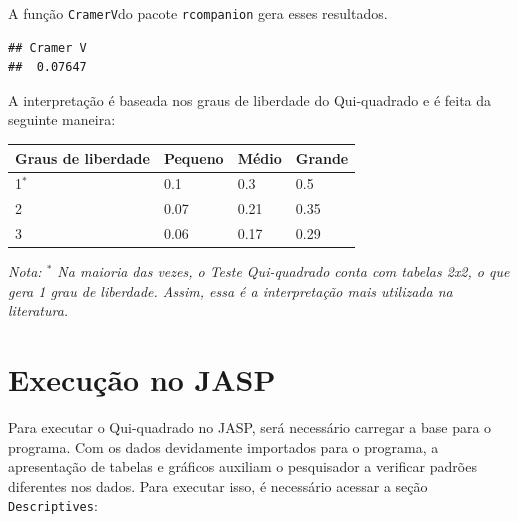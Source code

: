 \documentclass[
]{book}
\newenvironment{Shaded}{\begin{snugshade}}{\end{snugshade}}
\newcommand{\KeywordTok}[1]{\textcolor[rgb]{0.13,0.29,0.53}{\textbf{#1}}}
\newcommand{\NormalTok}[1]{#1}
\newcommand{\OperatorTok}[1]{\textcolor[rgb]{0.81,0.36,0.00}{\textbf{#1}}}
\begin{document}
A função \texttt{CramerV}do pacote \texttt{rcompanion} gera esses resultados.

\begin{Shaded}
\end{Shaded}

\begin{verbatim}
## Cramer V 
##  0.07647
\end{verbatim}

A interpretação é baseada nos graus de liberdade do Qui-quadrado e é feita da seguinte maneira:

\begin{longtable}[]{@{}llll@{}}
\toprule
Graus de liberdade & Pequeno & Médio & Grande\tabularnewline
\midrule
\endhead
1\(^*\) & 0.1 & 0.3 & 0.5\tabularnewline
2 & 0.07 & 0.21 & 0.35\tabularnewline
3 & 0.06 & 0.17 & 0.29\tabularnewline
\bottomrule
\end{longtable}

\emph{Nota: \(^*\) Na maioria das vezes, o Teste Qui-quadrado conta com tabelas 2x2, o que gera 1 grau de liberdade. Assim, essa é a interpretação mais utilizada na literatura.}

\hypertarget{execuuxe7uxe3o-no-jasp-1}{%
\section{Execução no JASP}\label{execuuxe7uxe3o-no-jasp-1}}

Para executar o Qui-quadrado no JASP, será necessário carregar a base para o programa. Com os dados devidamente importados para o programa, a apresentação de tabelas e gráficos auxiliam o pesquisador a verificar padrões diferentes nos dados. Para executar isso, é necessário acessar a seção \texttt{Descriptives}:
\end{document}
